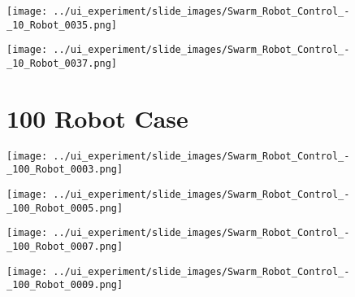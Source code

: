 	
\begin{minipage}{\linewidth}
	\centering	
	\begin{minipage}{0.42\linewidth}
		\texttt{[image: ../ui\_experiment/slide\_images/Swarm\_Robot\_Control\_-\_10\_Robot\_0035.png]}
		\label{fig:sub1}
	\end{minipage}
	\hspace{0.05\linewidth}
	\begin{minipage}{0.42\linewidth}
		\texttt{[image: ../ui\_experiment/slide\_images/Swarm\_Robot\_Control\_-\_10\_Robot\_0037.png]}
		\label{fig:sub2}
	\end{minipage}
	\label{fig:10_robot_slides}
\end{minipage}


\section{100 Robot Case}

\begin{minipage}{\linewidth}
	\centering
	\begin{minipage}{0.42\linewidth}
		\texttt{[image: ../ui\_experiment/slide\_images/Swarm\_Robot\_Control\_-\_100\_Robot\_0003.png]}
		\label{fig:sub1}
	\end{minipage}
	\hspace{0.05\linewidth}
	\begin{minipage}{0.42\linewidth}
		\texttt{[image: ../ui\_experiment/slide\_images/Swarm\_Robot\_Control\_-\_100\_Robot\_0005.png]}
		\label{fig:sub2}
	\end{minipage}
\end{minipage}

\begin{minipage}{\linewidth}
	\centering
	\begin{minipage}{0.42\linewidth}
		\texttt{[image: ../ui\_experiment/slide\_images/Swarm\_Robot\_Control\_-\_100\_Robot\_0007.png]}
		\label{fig:sub1}
	\end{minipage}
	\hspace{0.05\linewidth}
	\begin{minipage}{0.42\linewidth}
		\texttt{[image: ../ui\_experiment/slide\_images/Swarm\_Robot\_Control\_-\_100\_Robot\_0009.png]}
		\label{fig:sub2}
	\end{minipage}
\end{minipage}

